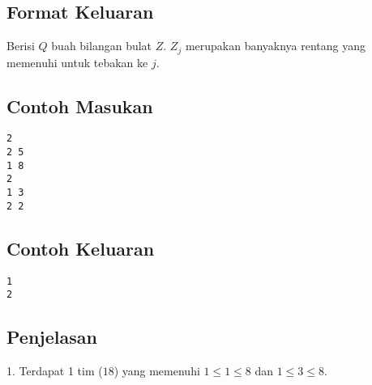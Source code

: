 \documentclass{article}
\begin{document}
\subsection*{Format Keluaran}
Berisi $Q$ buah bilangan bulat $Z$. $Z_j$ merupakan banyaknya rentang yang memenuhi untuk tebakan ke $j$.
\\

\begin{multicols}{2}
\subsection*{Contoh Masukan}
\begin{lstlisting}
2
2 5
1 8
2
1 3
2 2
\end{lstlisting}
\columnbreak
\subsection*{Contoh Keluaran}
\begin{lstlisting}
1
2
\end{lstlisting}
\vfill
\null
\end{multicols}

\subsection*{Penjelasan}
1. Terdapat 1 tim ($1 8$) yang memenuhi $1 \leq 1 \leq 8$ dan $1 \leq 3 \leq 8$.

\pagebreak
\end{document}
